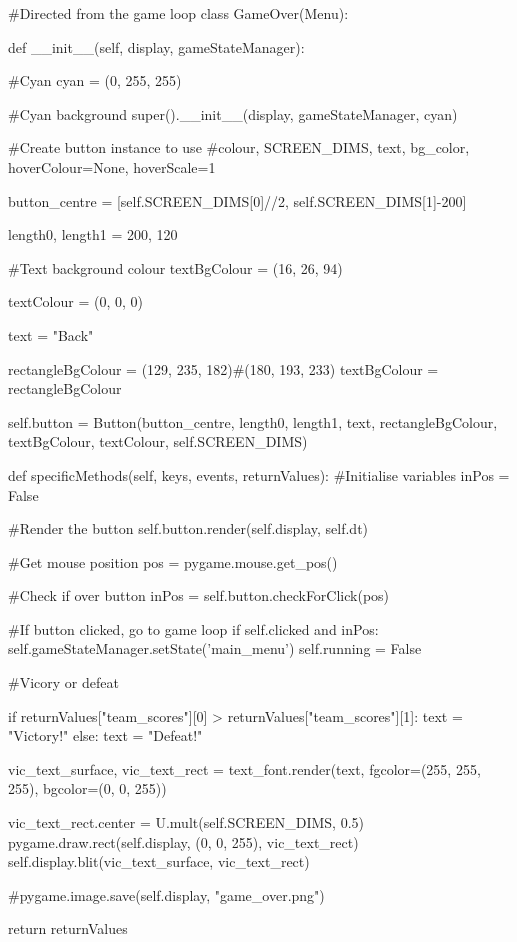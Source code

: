 \begin{mpy}
#Directed from the game loop
class GameOver(Menu):

    def __init__(self, display, gameStateManager):

        #Cyan
        cyan = (0, 255, 255)

        #Cyan background
        super().__init__(display, gameStateManager, cyan)

        #Create button instance to use
        #colour, SCREEN_DIMS, text, bg_color, hoverColour=None, hoverScale=1

        button_centre = [self.SCREEN_DIMS[0]//2, self.SCREEN_DIMS[1]-200]

        length0, length1 = 200, 120

        #Text background colour
        textBgColour = (16, 26, 94)

        textColour = (0, 0, 0)

        text = "Back"

        rectangleBgColour = (129, 235, 182)#(180, 193, 233)
        textBgColour = rectangleBgColour

        self.button = Button(button_centre, length0, length1, text, rectangleBgColour, textBgColour, textColour, self.SCREEN_DIMS)


    def specificMethods(self, keys, events, returnValues):
        #Initialise variables
        inPos = False

        #Render the button
        self.button.render(self.display, self.dt)

        #Get mouse position
        pos = pygame.mouse.get_pos()

        #Check if over button
        inPos = self.button.checkForClick(pos)

        #If button clicked, go to game loop
        if self.clicked and inPos:
            self.gameStateManager.setState('main_menu')
            self.running = False

        #Vicory or defeat

        if returnValues["team_scores"][0] > returnValues["team_scores"][1]:
            text = "Victory!"
        else:
            text = "Defeat!"

        vic_text_surface, vic_text_rect = text_font.render(text, 
            fgcolor=(255, 255, 255), bgcolor=(0, 0, 255))

        vic_text_rect.center = U.mult(self.SCREEN_DIMS, 0.5)
        pygame.draw.rect(self.display, (0, 0, 255), vic_text_rect)
        self.display.blit(vic_text_surface, vic_text_rect)

        #pygame.image.save(self.display, "game_over.png")
        
        return returnValues
\end{mpy}

